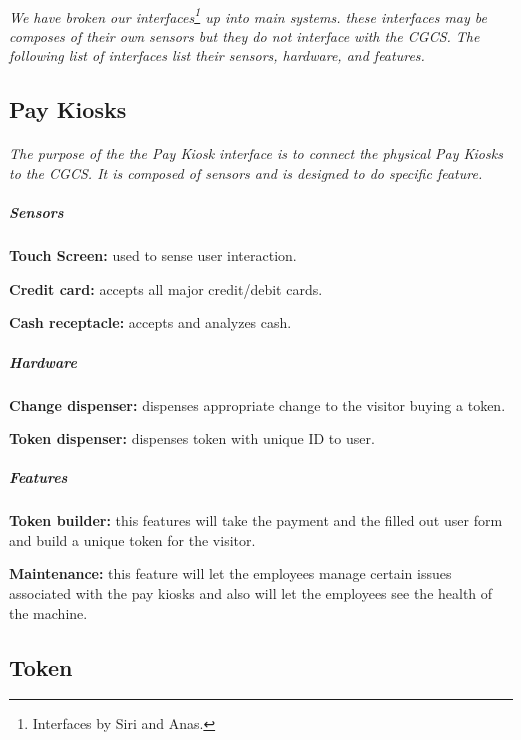 \documentclass[12pt]{article}
\begin{document}
\paragraph{} \textit{We have broken our interfaces\footnote{Interfaces by Siri and Anas.} up into main systems. these interfaces may be composes of their own sensors but they do not interface with the CGCS. The following list of interfaces list their sensors, hardware, and features.}

\subsection{Pay Kiosks}
	\paragraph{} \textit{The purpose of the the Pay Kiosk interface is to connect the physical Pay Kiosks to the CGCS. It is composed of sensors and is designed to do specific feature.}
		\subparagraph{Sensors}
			\begin{list}{}{}
					\item \textbf{Touch Screen: }used to sense user interaction. 
					\item \textbf{Credit card: }accepts all major credit/debit cards. 
					\item \textbf{Cash receptacle: }accepts and analyzes cash. 
			\end{list}
		\subparagraph{Hardware}
			\begin{list}{}{}
					\item \textbf{Change dispenser: }dispenses appropriate change to the visitor buying a token.
					\item \textbf{Token dispenser: }dispenses token with unique ID to user.
			\end{list}
		\subparagraph{Features}
			\begin{list}{}{}
					\item \textbf{Token builder: }this features will take the payment and the filled out user form and build a unique token for the visitor.
					\item \textbf{Maintenance: }this feature will let the employees manage certain issues associated with the pay kiosks and also will let the employees see the health of the machine. 
			\end{list}

\subsection{Token}
\end{document}
